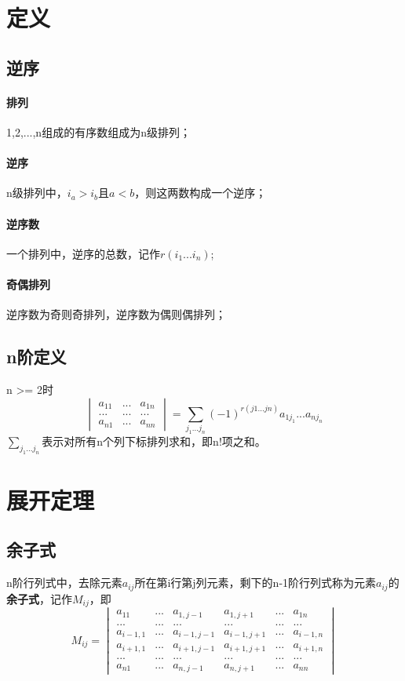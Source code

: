 \section{定义}

\subsection{逆序}

\paragraph{排列}
1,2,...,n组成的有序数组成为n级排列；

\paragraph{逆序}
n级排列中，\(i_a > i_b\)且\(a < b\)，则这两数构成一个逆序；

\paragraph{逆序数}
一个排列中，逆序的总数，记作\(r(i_1...i_n)\);

\paragraph{奇偶排列}
逆序数为奇则奇排列，逆序数为偶则偶排列；


\subsection{n阶定义}
n >= 2时
\[\begin{vmatrix}
a_{11} & ... & a_{1n} \\
... & ... & ... \\
a_{n1} & ... & a_{nn}
\end{vmatrix} = 
\sum_{j_1...j_n} (-1)^{r(j1...jn)}a_{1j_1}...a_{nj_n}\]
\(\displaystyle \sum_{j_1...j_n}^{}\)表示对所有n个列下标排列求和，即n!项之和。


\section{展开定理}

\subsection{余子式}

n阶行列式中，去除元素\(a_{ij}\)所在第i行第j列元素，剩下的n-1阶行列式称为元素\(a_{ij}\)的\textbf{余子式}，记作\(M_{ij}\)，即
\[M_{ij} = 
\begin{vmatrix}
a_{11} & ... & a_{1,j-1} & a_{1, j+1} & ... & a_{1n} \\
... & ... & ... & ... & ... & ... \\
a_{i-1,1} & ... & a_{i-1,j-1} & a_{i-1, j+1} & ... & a_{i-1,n} \\
a_{i+1,1} & ... & a_{i+1,j-1} & a_{i+1, j+1} & ... & a_{i+1,n} \\
... & ... & ... & ... & ... & ... \\
a_{n1} & ... & a_{n,j-1} & a_{n, j+1} & ... & a_{nn}
\end{vmatrix}\]


